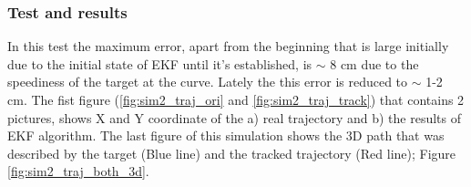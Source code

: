 \subsubsection{Test and results}
\label{lab:sim2_test_results}
In this test the maximum error, apart from the beginning that is large initially due to the initial state of EKF until it's established, is $\sim$ 8 cm due to the speediness of the target at the curve. Lately the this error is reduced to $\sim$ 1-2 cm. The fist figure (\ref{fig:sim2_traj_ori} and \ref{fig:sim2_traj_track}) that contains 2 pictures, shows X and Y coordinate of the a) real trajectory and b) the results of EKF algorithm. The last figure of this simulation shows the 3D path that was described by the target (Blue line) and the tracked trajectory (Red line); Figure \ref{fig:sim2_traj_both_3d}.

